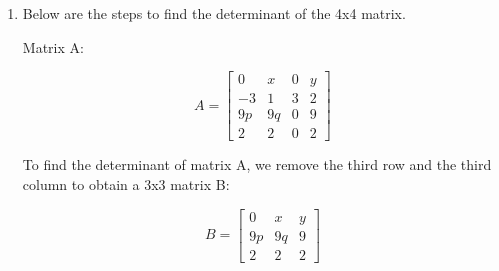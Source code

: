\documentclass{article}
\begin{document}
\begin{enumerate}
    Solving this system of equations:
    
    \[
    \begin{aligned}
    y_1 &= 1 \\
    3y_1 + y_2 &= 5 \implies y_2 &= 2 \\
    y_1 + 1.5y_2 + y_3 &= 10 \implies y_3 &= 6
    \end{aligned}
    \]
    
    Next, solve Ux = y:
    
    \[
    \begin{bmatrix}
    1 & 1 & 1 \\
    0 & -2 & -6 \\
    0 & 0 & 3
    \end{bmatrix}
    \begin{bmatrix}
    x_1 \\
    x_2 \\
    x_3
    \end{bmatrix}
    =
    \begin{bmatrix}
    1 \\
    2 \\
    6
    \end{bmatrix}
    \]
    
    Solving this system of equations:
    
    \[
    \begin{aligned}
    x_3 &= 2 \\
    -2x_2 - 6x_3 &= 2 \implies x_2 &= -7 \\
    x_1 + x_2 + x_3 &= 1 \implies x_1 &= 6
    \end{aligned}
    \]

    \item Below are the steps to find the determinant of the 4x4 matrix. 

    Matrix A:

\[
A = \begin{bmatrix}
0 & x & 0 & y \\
-3 & 1 & 3 & 2 \\
9p & 9q & 0 & 9 \\
2 & 2 & 0 & 2
\end{bmatrix}
\]

To find the determinant of matrix A, we remove the third row and the third column to obtain a 3x3 matrix B:

\[
B = \begin{bmatrix}
0 & x & y \\
9p & 9q & 9 \\
2 & 2 & 2
\end{bmatrix}
\]


\end{enumerate}
\end{document}
